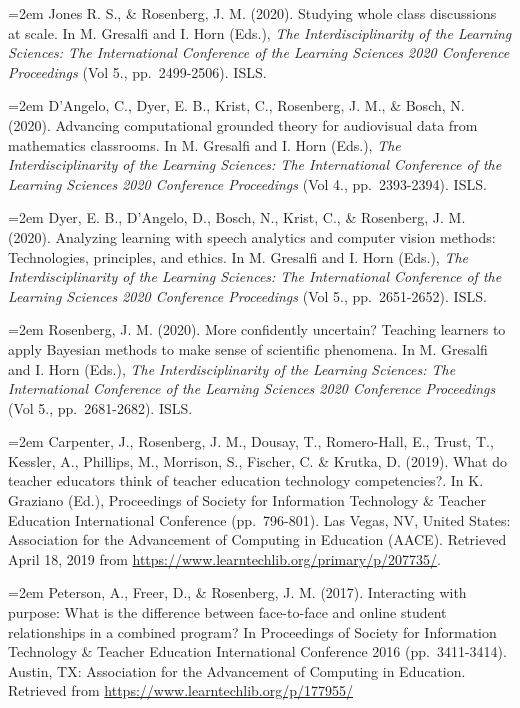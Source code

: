 \documentclass[
  14,
]{article}
\begin{document}
\hangindent=2em Jones R. S., \& Rosenberg, J. M. (2020). Studying whole
class discussions at scale. In M. Gresalfi and I. Horn (Eds.), \emph{The
Interdisciplinarity of the Learning Sciences: The International
Conference of the Learning Sciences 2020 Conference Proceedings} (Vol
5., pp.~2499-2506). ISLS.

\hangindent=2em D'Angelo, C., Dyer, E. B., Krist, C., Rosenberg, J. M.,
\& Bosch, N. (2020). Advancing computational grounded theory for
audiovisual data from mathematics classrooms. In M. Gresalfi and I. Horn
(Eds.), \emph{The Interdisciplinarity of the Learning Sciences: The
International Conference of the Learning Sciences 2020 Conference
Proceedings} (Vol 4., pp.~2393-2394). ISLS.

\hangindent=2em Dyer, E. B., D'Angelo, D., Bosch, N., Krist, C., \&
Rosenberg, J. M. (2020). Analyzing learning with speech analytics and
computer vision methods: Technologies, principles, and ethics. In M.
Gresalfi and I. Horn (Eds.), \emph{The Interdisciplinarity of the
Learning Sciences: The International Conference of the Learning Sciences
2020 Conference Proceedings} (Vol 5., pp.~2651-2652). ISLS.

\hangindent=2em Rosenberg, J. M. (2020). More confidently uncertain?
Teaching learners to apply Bayesian methods to make sense of scientific
phenomena. In M. Gresalfi and I. Horn (Eds.), \emph{The
Interdisciplinarity of the Learning Sciences: The International
Conference of the Learning Sciences 2020 Conference Proceedings} (Vol
5., pp.~2681-2682). ISLS.

\hangindent=2em Carpenter, J., Rosenberg, J. M., Dousay, T.,
Romero-Hall, E., Trust, T., Kessler, A., Phillips, M., Morrison, S.,
Fischer, C. \& Krutka, D. (2019). What do teacher educators think of
teacher education technology competencies?. In K. Graziano (Ed.),
Proceedings of Society for Information Technology \& Teacher Education
International Conference (pp.~796-801). Las Vegas, NV, United States:
Association for the Advancement of Computing in Education (AACE).
Retrieved April 18, 2019 from
\url{https://www.learntechlib.org/primary/p/207735/}.

\hangindent=2em Peterson, A., Freer, D., \& Rosenberg, J. M. (2017).
Interacting with purpose: What is the difference between face-to-face
and online student relationships in a combined program? In Proceedings
of Society for Information Technology \& Teacher Education International
Conference 2016 (pp.~3411-3414). Austin, TX: Association for the
Advancement of Computing in Education. Retrieved from
\url{https://www.learntechlib.org/p/177955/}
\end{document}
